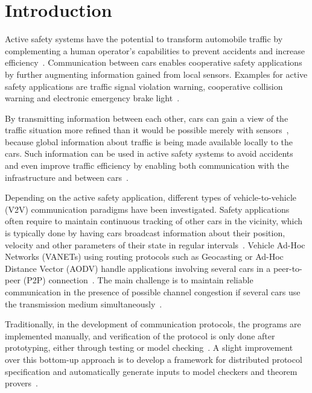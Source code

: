 \documentclass{sig-alternate}
\begin{document}


\vspace{-.06in}
\section{Introduction}

Active safety systems have the potential to transform automobile traffic by complementing a human operator's capabilities to prevent accidents and increase efficiency~\cite{Caveney}. Communication between cars enables cooperative safety applications by further augmenting information gained from local sensors. Examples for active safety applications are traffic signal violation warning, cooperative collision warning and electronic emergency brake light~\cite{Caveney,Sengupta2}.

By transmitting information between each other, cars can gain a view of the traffic situation more refined than it would be possible merely with sensors~\cite{VComm}, because global information about traffic is being made available locally to the cars. Such information can be used in active safety systems to avoid accidents and even improve traffic efficiency by enabling both communication with the infrastructure and between cars~\cite{highways,Caveney,Dresner, collisionwarning, rearend}.

Depending on the active safety application, different types of vehicle-to-vehicle (V2V) communication paradigms have been investigated. Safety applications often require to maintain continuous tracking of other cars in the vicinity, which is typically done by having cars broadcast information about their position, velocity and other parameters of their state in regular intervals~\cite{Sengupta2}. Vehicle Ad-Hoc Networks (VANETs) using routing protocols such as Geocasting or Ad-Hoc Distance Vector (AODV) handle applications involving several cars in a peer-to-peer (P2P) connection~\cite{hartenstein,RAODV,geocasting}. The main challenge is to maintain reliable communication in the presence of possible channel congestion if several cars use the transmission medium simultaneously~\cite{hartenstein, routing}.

Traditionally, in the development of communication protocols, the programs are implemented manually, and verification of the protocol is only done after prototyping, either through testing or model checking~\cite{CSMA, AODVVerify, AdHocVerify}. A slight improvement over this bottom-up approach is to develop a framework for distributed protocol specification and automatically generate inputs to model checkers and theorem provers~\cite{DeclarativeNetwork}. 
\end{document}
